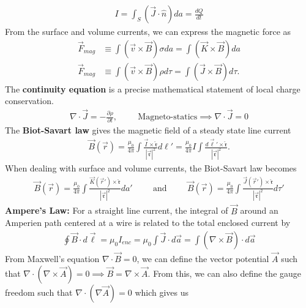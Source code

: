 \begin{align}
	I = \int_S (\vec{J}\cdot \hat{n})da = \frac{dQ}{dt} 
\end{align}
From the surface and volume currents, we can express the magnetic force as
\begin{align}
	\vec{F}_{mag} &\equiv \int (\vec{v}\times \vec{B})\sigma da = \int (\vec{K}\times \vec{B})da \\
	\vec{F}_{mag} &\equiv \int (\vec{v}\times \vec{B})\rho d\tau = \int (\vec{J}\times \vec{B})d\tau.
\end{align} 
The \textbf{continuity equation} is a precise mathematical statement of local charge conservation.
\begin{align}
	\nabla \cdot \vec{J} = -\frac{\partial \rho}{\partial t}, \hspace{1cm}\textrm{Magneto-statics} \implies \nabla \cdot \vec{J} = 0 
\end{align}
The \textbf{Biot-Savart law} gives the magnetic field of a steady state line current
\begin{align}
	\vec{B}(\vec{r})=\frac{\mu_0}{4\pi}\int \frac{\vec{I}\times \mathfrak{\hat{r}}}{|\vec{\mathfrak{r}}|^2}d\ell' =\frac{\mu_0}{4\pi}I\int \frac{d\vec{\ell}'\times \mathfrak{\hat{r}}}{|\vec{\mathfrak{r}}|^2}. 
\end{align}
When dealing with surface and volume currents, the Biot-Savart law becomes
\begin{align}
	\vec{B}(\vec{r})=\frac{\mu_0}{4\pi}\int \frac{\vec{K}(\vec{r}')\times \mathfrak{\hat{r}}}{|\vec{\mathfrak{r}}|^2}da'\hspace{1cm}\textrm{and}\hspace{1cm}\vec{B}(\vec{r})=\frac{\mu_0}{4\pi}\int \frac{\vec{J}(\vec{r}')\times \mathfrak{\hat{r}}}{|\vec{\mathfrak{r}}|^2}d\tau'
\end{align}
\textbf{Ampere's Law:} For a straight line current, the integral of $\vec{B}$ around an Amperien path centered at a wire is related to the total enclosed current by
\begin{align}
	\oint\vec{B}\cdot d\vec{\ell} = \mu_0 I_{enc} = \mu_0 \int \vec{J} \cdot d\vec{a} = \int (\nabla \times \vec{B})\cdot d\vec{a}
\end{align}
From Maxwell's equation $\nabla \cdot \vec{B}=0$, we can define the vector potential $\vec{A}$ such that $\nabla \cdot (\nabla \times \vec{A}) = 0 \implies \vec{B} = \nabla \times \vec{A}$. From this, we can also define the gauge freedom such that $\nabla \cdot (\nabla \vec{A})=0$ which gives us
